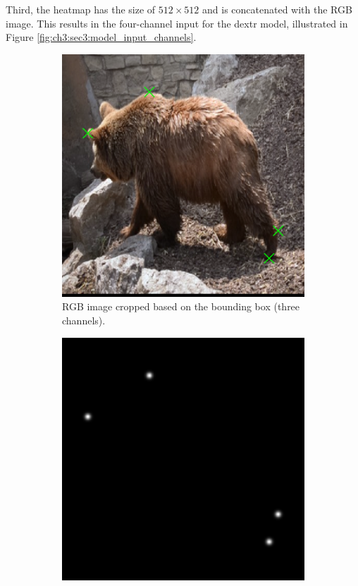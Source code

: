 Third, the heatmap has the size of $512 \times 512$  and is concatenated with the RGB image.
This results in the four-channel input for the \gls{dextr} model, illustrated in Figure \ref{fig:ch3:sec3:model_input_channels}.

\begin{figure}
	\centering
	\begin{subfigure}[b]{0.3\textwidth}
		\centering
		\includegraphics[width=\textwidth]{figures/chap33_channel_rgb.png}
		\caption{RGB image cropped based on the bounding box (three channels).}
		\label{fig:ch3:sec3:rgb_channel}
	\end{subfigure}
	\hfill
	\begin{subfigure}[b]{0.3\textwidth}
		\centering
		\includegraphics[width=\textwidth]{figures/chap33_channel_fg.png}

\end{subfigure}
\end{figure}
